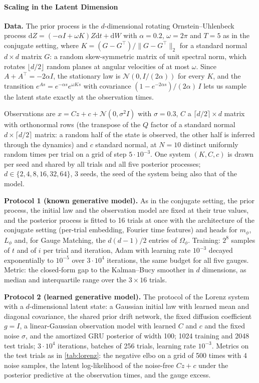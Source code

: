 \documentclass{article} %
\newcommand{\vol}{g}
\newcommand{\gauge}{\Omega}
\newcommand{\diff}{{\mathrm{d}}}
\newcommand{\Norm}{\mathcal{N}}
\begin{document}
\paragraph{Scaling in the Latent Dimension}
\textbf{Data.} The prior process is the $d$-dimensional rotating Ornstein--Uhlenbeck process $\diff Z = (-\alpha I + \omega K) Z \diff t + \diff W$ with $\alpha = 0.2$, $\omega = 2\pi$ and $T = 5$ as in the conjugate setting, where $K = (G - G^\top) / \|G - G^\top\|_2$ for a standard normal $d \times d$ matrix $G$: a random skew-symmetric matrix of unit spectral norm, which rotates $\lfloor d/2 \rfloor$ random planes at angular velocities of at most $\omega$. Since $A + A^\top = -2\alpha I$, the stationary law is $\Norm(0, I / (2\alpha))$ for every $K$, and the transition $e^{A s} = e^{-\alpha s} e^{\omega K s}$ with covariance $(1 - e^{-2\alpha s}) / (2\alpha) \, I$ lets us sample the latent state exactly at the observation times.

Observations are $x = C z + c + \Norm(0, \sigma^2 I)$ with $\sigma = 0.3$, $C$ a $\lceil d/2 \rceil \times d$ matrix with orthonormal rows (the transpose of the $Q$ factor of a standard normal $d \times \lceil d/2 \rceil$ matrix: a random half of the state is observed, the other half is inferred through the dynamics) and $c$ standard normal, at $N = 10$ distinct uniformly random times per trial on a grid of step $5 \cdot 10^{-3}$. One system $(K, C, c)$ is drawn per seed and shared by all trials and all five posterior processes; $d \in \{2, 4, 8, 16, 32, 64\}$, 3 seeds, the seed of the system being also that of the model.

\textbf{Protocol 1 (known generative model).} As in the conjugate setting, the prior process, the initial law and the observation model are fixed at their true values, and the posterior process is fitted to 16 trials at once with the architecture of the conjugate setting (per-trial embedding, Fourier time features) and heads for $m_\phi$, $L_\phi$ and, for Gauge Matching, the $d(d-1)/2$ entries of $\gauge_\phi$. Training: $2^8$ samples of $t$ and of $i$ per trial and iteration, Adam with learning rate $10^{-3}$ decayed exponentially to $10^{-5}$ over $3 \cdot 10^4$ iterations, the same budget for all five gauges. Metric: the closed-form gap to the Kalman--Bucy smoother in $d$ dimensions, as median and interquartile range over the $3 \times 16$ trials.

\textbf{Protocol 2 (learned generative model).} The protocol of the Lorenz system with a $d$-dimensional latent state: a Gaussian initial law with learned mean and diagonal covariance, the shared prior drift network, the fixed diffusion coefficient $\vol = I$, a linear-Gaussian observation model with learned $C$ and $c$ and the fixed noise $\sigma$, and the amortized GRU posterior of width 100; 1024 training and 2048 test trials; $3 \cdot 10^4$ iterations, batches of 256 trials, learning rate $10^{-3}$. Metrics on the test trials as in \cref{tab:lorenz}: the negative \gls{elbo} on a grid of 500 times with 4 noise samples, the latent log-likelihood of the noise-free $C z + c$ under the posterior predictive at the observation times, and the gauge excess.
\end{document}
